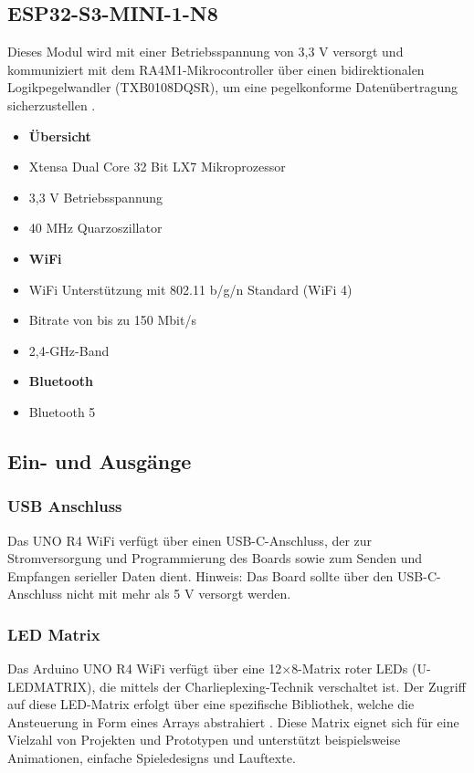 \subsection{ESP32-S3-MINI-1-N8}
Dieses Modul wird mit einer Betriebsspannung von 3,3 V versorgt und kommuniziert mit dem RA4M1-Mikrocontroller über einen bidirektionalen Logikpegelwandler (TXB0108DQSR), um eine pegelkonforme Datenübertragung sicherzustellen \cite{Arduino:2026}.
\begin{itemize}
	\item \textbf{Übersicht}
		\item Xtensa Dual Core 32 Bit LX7 Mikroprozessor
		\item 3,3 V Betriebsspannung
		\item 40 MHz Quarzoszillator
	\item \textbf{WiFi}
		\item WiFi Unterstützung mit 802.11 b/g/n Standard (WiFi 4)
		\item Bitrate von bis zu 150 Mbit/s
		\item 2,4-GHz-Band
	\item \textbf{Bluetooth}
		\item Bluetooth 5
	\end{itemize}

\subsection{Ein- und Ausgänge}
\subsubsection{USB Anschluss}

	Das UNO R4 WiFi verfügt über einen USB-C-Anschluss, der zur Stromversorgung und Programmierung des Boards sowie zum Senden und Empfangen serieller Daten dient.
	Hinweis: Das Board sollte über den USB-C-Anschluss nicht mit mehr als 5 V versorgt werden.

\subsubsection{LED Matrix}
	Das Arduino UNO R4 WiFi verfügt über eine 12×8-Matrix roter LEDs (U-LEDMATRIX), die mittels der Charlieplexing-Technik verschaltet ist. Der Zugriff auf diese LED-Matrix erfolgt über eine spezifische Bibliothek, welche die Ansteuerung in Form eines Arrays abstrahiert \cite{Arduino:2026}.
	Diese Matrix eignet sich für eine Vielzahl von Projekten und Prototypen und unterstützt beispielsweise Animationen, einfache Spieledesigns und Lauftexte.

